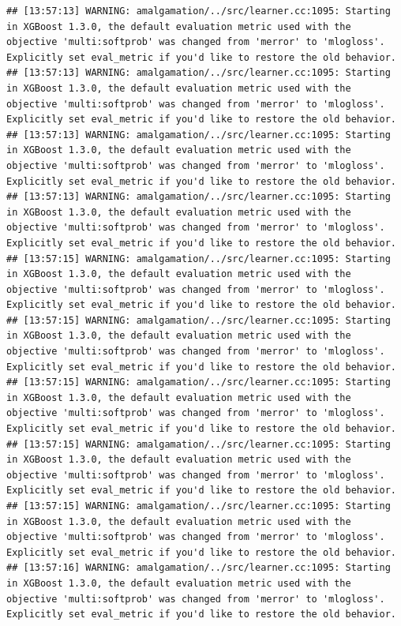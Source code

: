 \documentclass[
]{scrbook}
\begin{document}
\begin{verbatim}
## [13:57:13] WARNING: amalgamation/../src/learner.cc:1095: Starting in XGBoost 1.3.0, the default evaluation metric used with the objective 'multi:softprob' was changed from 'merror' to 'mlogloss'. Explicitly set eval_metric if you'd like to restore the old behavior.
## [13:57:13] WARNING: amalgamation/../src/learner.cc:1095: Starting in XGBoost 1.3.0, the default evaluation metric used with the objective 'multi:softprob' was changed from 'merror' to 'mlogloss'. Explicitly set eval_metric if you'd like to restore the old behavior.
## [13:57:13] WARNING: amalgamation/../src/learner.cc:1095: Starting in XGBoost 1.3.0, the default evaluation metric used with the objective 'multi:softprob' was changed from 'merror' to 'mlogloss'. Explicitly set eval_metric if you'd like to restore the old behavior.
## [13:57:13] WARNING: amalgamation/../src/learner.cc:1095: Starting in XGBoost 1.3.0, the default evaluation metric used with the objective 'multi:softprob' was changed from 'merror' to 'mlogloss'. Explicitly set eval_metric if you'd like to restore the old behavior.
## [13:57:15] WARNING: amalgamation/../src/learner.cc:1095: Starting in XGBoost 1.3.0, the default evaluation metric used with the objective 'multi:softprob' was changed from 'merror' to 'mlogloss'. Explicitly set eval_metric if you'd like to restore the old behavior.
## [13:57:15] WARNING: amalgamation/../src/learner.cc:1095: Starting in XGBoost 1.3.0, the default evaluation metric used with the objective 'multi:softprob' was changed from 'merror' to 'mlogloss'. Explicitly set eval_metric if you'd like to restore the old behavior.
## [13:57:15] WARNING: amalgamation/../src/learner.cc:1095: Starting in XGBoost 1.3.0, the default evaluation metric used with the objective 'multi:softprob' was changed from 'merror' to 'mlogloss'. Explicitly set eval_metric if you'd like to restore the old behavior.
## [13:57:15] WARNING: amalgamation/../src/learner.cc:1095: Starting in XGBoost 1.3.0, the default evaluation metric used with the objective 'multi:softprob' was changed from 'merror' to 'mlogloss'. Explicitly set eval_metric if you'd like to restore the old behavior.
## [13:57:15] WARNING: amalgamation/../src/learner.cc:1095: Starting in XGBoost 1.3.0, the default evaluation metric used with the objective 'multi:softprob' was changed from 'merror' to 'mlogloss'. Explicitly set eval_metric if you'd like to restore the old behavior.
## [13:57:16] WARNING: amalgamation/../src/learner.cc:1095: Starting in XGBoost 1.3.0, the default evaluation metric used with the objective 'multi:softprob' was changed from 'merror' to 'mlogloss'. Explicitly set eval_metric if you'd like to restore the old behavior.

\end{verbatim}
\end{document}
